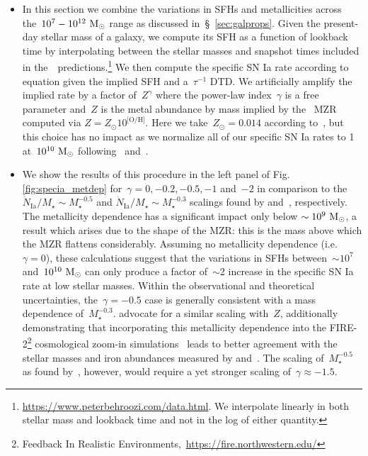 \documentclass[ms.tex]{subfiles}
\begin{document}
\begin{itemize}

	\item In this section we combine the variations in SFHs and metallicities
	across the~$10^7 - 10^{12}~\text{M}_\odot$ range as discussed
	in~\S~\ref{sec:galprops}.
	Given the present-day stellar mass of a galaxy, we compute its SFH as a
	function of lookback time by interpolating between the stellar masses and
	snapshot times included in the~\um~predictions.\footnote{
		\url{https://www.peterbehroozi.com/data.html}. We interpolate linearly
		in both stellar mass and lookback time and not in the log of either
		quantity.
	}
	We then compute the specific SN Ia rate according to equation
	 given the implied SFH and a~$\tau^{-1}$ DTD.
	We artificially amplify the implied rate by a factor of~$Z^{\gamma}$
	where the power-law index~$\gamma$ is a free parameter and~$Z$ is the metal
	abundance by mass implied by the~\citet{Zahid2014} MZR computed via
	$Z = Z_\odot 10^\text{[O/H]}$.
	Here we take~$Z_\odot = 0.014$ according to~\citet{Asplund2009}, but this
	choice has no impact as we normalize all of our specific SN Ia rates to 1
	at~$10^{10}~\text{M}_\odot$ following~\citet{Brown2019} and~\citet{Gandhi2022}.

	\item We show the results of this procedure in the left panel of Fig.
	\ref{fig:specia_metdep} for~$\gamma = 0, -0.2, -0.5, -1$ and~$-2$ in
	comparison to the~$\dot{N}_\text{Ia} / M_\star \sim M_\star^{-0.5}$ and
	$\dot{N}_\text{Ia} / M_\star \sim M_\star^{-0.3}$ scalings found by
	\citet{Brown2019} and~\citet{Gandhi2022}, respectively.
	The metallicity dependence has a significant impact only below
	$\sim10^9~\text{M}_\odot$, a result which arises due to the shape of the MZR: this
	is the mass above which the MZR flattens considerably.
	Assuming no metallicity dependence (i.e.~$\gamma = 0$), these calculations
	suggest that the variations in SFHs between~$\sim10^7$ and~$10^{10}~\text{M}_\odot$
	can only produce a factor of~$\sim$2 increase in the specific SN Ia rate
	at low stellar masses.
	Within the observational and theoretical uncertainties, the~$\gamma = -0.5$
	case is generally consistent with a mass dependence of~$M_\star^{-0.3}$.
	\citet{Gandhi2022} advocate for a similar scaling with~$Z$, additionally
	demonstrating that incorporating this metallicity dependence into the
	FIRE-2\footnote{
		Feedback In Realistic Environments,~\url{https://fire.northwestern.edu/}
	}
	cosmological zoom-in simulations~\citep{Hopkins2018} leads to better
	agreement with the stellar masses and iron abundances measured by
	\citet{Gallazzi2005} and~\citet{Kirby2013}.
	The scaling of~$M_\star^{-0.5}$ as found by~\citet{Brown2019}, however,
	would require a yet stronger scaling of~$\gamma \approx -1.5$.


\end{itemize}
\end{document}
